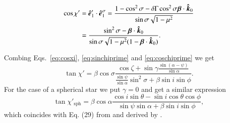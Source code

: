 \documentclass{aa}
\newcommand{\be}{\begin{equation}}
\newcommand{\ee}{\end{equation}}
\newcommand{\unit}[1]{\mbox{\boldmath $\hat{#1}$}}
\newcommand{\red}[1]{\textcolor{red}{#1}}
\begin{document}
\begin{align}
\cos\chi'&=\unit{e}_1'\cdot \unit{e}_1^{\sigma} =
\frac{1-\cos^2\sigma- \delta  \Gamma \cos^2 \sigma   \bm \beta \cdot \unit{k}_0 }{\sin{\sigma}\sqrt{1-\mu^2} } \nonumber  \\
&=\frac{\sin^2\sigma -\bm \beta \cdot \unit{k}_0 }{\sin{\sigma}\sqrt{1-\mu^2} (1-\bm \beta \cdot \unit{k}_0) }. 
\label{eq:coschiprime}
\end{align}	

Combing Eqs.~\eqref{eq:cosxi}, \eqref{eq:sinchiprime} and \eqref{eq:coschiprime} we get 
\be\label{eq:chiprime}
\tan\chi' = \beta \cos \sigma\frac{\cos\zeta + \sin \gamma  \frac{\sin (\alpha-\psi)}{\sin \alpha}}{\frac{\sin \psi}{\sin \alpha}\sin^{2}\sigma + \beta \sin i \sin \phi}.
\ee
For the case of a spherical star we put $\gamma=0$ and get a similar expression
\be\label{eq:chiprime_sphere}
\tan\chi'_{\mathrm{sph}} = \beta 
\cos \alpha \frac{\cos i \sin \theta - \sin i \cos \theta \cos \phi}{\sin \psi\sin\alpha + \beta \sin i \sin \phi
},
\ee
which coincides with Eq. (29) from \citet{VP04} and derived by \citet{poutanen20}.
\end{document}
